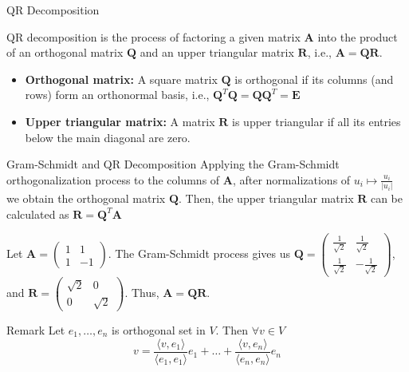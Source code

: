 \documentclass[fullscreen=true, bookmarks=true, hyperref={pdfencoding=unicode}]{beamer}
\begin{document}
\begin{frame}{QR Decomposition}
  
  QR decomposition is the process of factoring a given matrix $\mathbf{A}$ into the product of an orthogonal matrix $\mathbf{Q}$ and an upper triangular matrix $\mathbf{R}$, i.e., $\mathbf{A} = \mathbf{Q}\mathbf{R}$.
  
  \begin{itemize}
  \item \textbf{Orthogonal matrix:} A square matrix $\mathbf{Q}$ is orthogonal 
  if its columns (and rows) form an orthonormal basis, i.e., 
  $\mathbf{Q}^T\mathbf{Q} = \mathbf{Q}\mathbf{Q}^T = \mathbf{E}$
  \item \textbf{Upper triangular matrix:} A matrix $\mathbf{R}$ is upper triangular 
  if all its entries below the main diagonal are zero.
  \end{itemize}
  
  \begin{block}{Gram-Schmidt and QR Decomposition}
  Applying the Gram-Schmidt orthogonalization process 
  to the columns of $\mathbf{A}$, after normalizations of $u_i \mapsto \frac{u_i}{|u_i|}$
  we obtain the orthogonal matrix $\mathbf{Q}$. 
  Then, the upper triangular matrix $\mathbf{R}$ can be calculated 
  as $\mathbf{R} = \mathbf{Q}^T\mathbf{A}$
  \end{block} 
\end{frame}


\begin{frame}
  \begin{example}
  Let $\mathbf{A} = \begin{pmatrix} 1 & 1 \\ 1 & -1 \end{pmatrix}$. 
  The Gram-Schmidt process gives us 
  $\mathbf{Q} = \begin{pmatrix} \frac{1}{\sqrt{2}} & \frac{1}{\sqrt{2}} \\ 
    \frac{1}{\sqrt{2}} & -\frac{1}{\sqrt{2}} \end{pmatrix}$, 
  and $\mathbf{R} = \begin{pmatrix} \sqrt{2} & 0 \\ 0 & \sqrt{2} \end{pmatrix}$.
  Thus, $\mathbf{A} = \mathbf{Q}\mathbf{R}$.
  \end{example}

  \begin{block}{Remark}
    Let $e_1, \dots, e_n$ is orthogonal set in $V$. Then $\forall v \in V$
    $$v = 
    \frac{\langle v, e_1\rangle}{\langle e_1, e_1\rangle} e_1 + \dots + 
    \frac{\langle v, e_n\rangle}{\langle e_n, e_n\rangle} e_n$$
  \end{block}
\end{frame}
\end{document}
